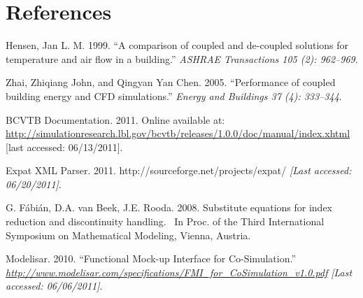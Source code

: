 \chapter{References}\label{references}

Hensen, Jan L. M. 1999. ``A comparison of coupled and de-coupled solutions for temperature and air flow in a building.'' \emph{ASHRAE Transactions 105 (2): 962--969}.

Zhai, Zhiqiang John, and Qingyan Yan Chen. 2005. ``Performance of coupled building energy and CFD simulations.'' \emph{Energy and Buildings 37 (4): 333--344}.

BCVTB Documentation. 2011. Online available at: \url{http://simulationresearch.lbl.gov/bcvtb/releases/1.0.0/doc/manual/index.xhtml} {[}last accessed: 06/13/2011{]}.

Expat XML Parser. 2011. http://sourceforge.net/projects/expat/ \emph{{[}Last accessed: 06/20/2011{]}}.

G. Fábián, D.A. van Beek, J.E. Rooda. 2008. Substitute equations for index reduction and discontinuity handling.~ In Proc. of the Third International Symposium on Mathematical Modeling, Vienna, Austria.

Modelisar. 2010. ``Functional Mock-up Interface for Co-Simulation.'' \href{http://www.modelisar.com/specifications/FMI_for_CoSimulation_v1.0.pdf}{\emph{http://www.modelisar.com/specifications/FMI\_for\_CoSimulation\_v1.0.pdf}} \emph{{[}Last accessed: 06/06/2011{]}}.
